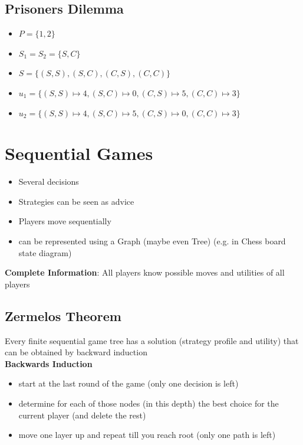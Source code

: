 \documentclass[12pt,a4paper]{article}
\newcommand{\ecb}[1]{\{#1\}}
\begin{document}
\subsection{Prisoners Dilemma}
\begin{itemize}
\setlength\itemsep{0.05cm}
\item $P = \ecb{1,2}$
\item $S_1 = S_2 = \ecb{S,C}$
\item $S = \ecb{(S,S),(S,C),(C,S),(C,C)}$
\item $u_1 = \ecb{(S,S)\mapsto 4, (S,C) \mapsto 0, (C,S) \mapsto 5, (C,C) \mapsto 3}$ 
\item $u_2 = \ecb{(S,S)\mapsto 4, (S,C) \mapsto 5, (C,S) \mapsto 0, (C,C) \mapsto 3}$ 
\end{itemize}

\section{Sequential Games}
\begin{itemize}
\setlength\itemsep{0.05cm}
\item Several decisions
\item Strategies can be seen as advice
\item Players move sequentially
\item can be represented using a Graph (maybe even Tree) (e.g. in Chess board state diagram)
\end{itemize}
\textbf{Complete Information}: All players know possible moves and utilities of all players\\

\subsection{Zermelos Theorem}
Every finite sequential game tree has a solution (strategy profile and utility) that can be obtained by backward induction\\
\textbf{Backwards Induction}
\begin{itemize}
\setlength\itemsep{0.05cm}
\item start at the last round of the game (only one decision is left)
\item determine for each of those nodes (in this depth) the best choice for the current player (and delete the rest)
\item move one layer up and repeat till you reach root (only one path is left)
\end{itemize}
\end{document}
